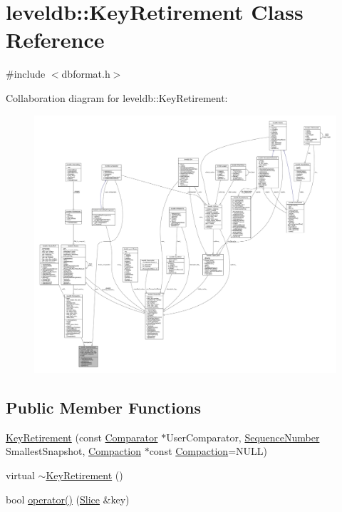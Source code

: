 \hypertarget{classleveldb_1_1_key_retirement}{}\section{leveldb\+:\+:Key\+Retirement Class Reference}
\label{classleveldb_1_1_key_retirement}


{\ttfamily \#include $<$dbformat.\+h$>$}



Collaboration diagram for leveldb\+:\+:Key\+Retirement\+:
\nopagebreak
\begin{figure}[H]
\begin{center}
\leavevmode
\includegraphics[width=350pt]{classleveldb_1_1_key_retirement__coll__graph}
\end{center}
\end{figure}
\subsection*{Public Member Functions}
\begin{DoxyCompactItemize}
\item 
\hyperlink{classleveldb_1_1_key_retirement_a2797c52c20659b94d0a68aaa0ef2d0cb}{Key\+Retirement} (const \hyperlink{structleveldb_1_1_comparator}{Comparator} $\ast$User\+Comparator, \hyperlink{namespaceleveldb_a5481ededd221c36d652c371249f869fa}{Sequence\+Number} Smallest\+Snapshot, \hyperlink{classleveldb_1_1_compaction}{Compaction} $\ast$const \hyperlink{classleveldb_1_1_compaction}{Compaction}=N\+U\+L\+L)
\item 
virtual \hyperlink{classleveldb_1_1_key_retirement_a13dbc1c6ac0bd9a167b4322665b62d72}{$\sim$\+Key\+Retirement} ()
\item 
bool \hyperlink{classleveldb_1_1_key_retirement_acfe7bf9d6623067c42fc414480ac27e1}{operator()} (\hyperlink{classleveldb_1_1_slice}{Slice} \&key)
\end{DoxyCompactItemize}
